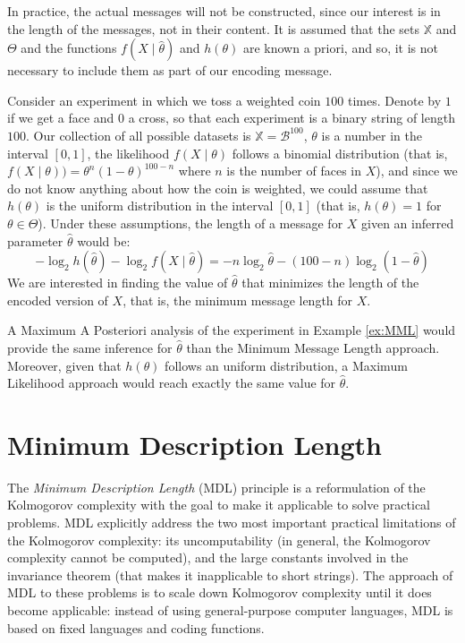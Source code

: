 {\begin{definition}
\end{definition}

In practice, the actual messages will not be constructed, since our interest is in the length of the messages, not in their content. It is assumed that the sets $\mathbb{X}$ and $\Theta$ and the functions $f(X \mid \hat\theta)$ and $h(\theta)$ are known a priori, and so, it is not necessary to include them as part of our encoding message.

\begin{example}
    \label{ex:MML}
    Consider an experiment in which we toss a weighted coin $100$ times. Denote by $1$ if we get a face and $0$ a cross, so that each experiment is a binary string of length $100$. Our collection of all possible datasets is $\mathbb{X} = \mathcal{B}^{100}$, $\theta$ is a number in the interval $[0, 1]$, the likelihood $f (X \mid \theta)$ follows a binomial distribution (that is, $f (X \mid \theta) ) = \theta^n (1-\theta)^{100-n}$ where $n$ is the number of faces in $X$), and since we do not know anything about how the coin is weighted, we could assume that $h(\theta)$ is the uniform distribution in the interval $[0, 1]$ (that is, $h(\theta) = 1$ for $\theta \in \Theta$). Under these assumptions, the length of a message for $X$ given an inferred parameter $\hat\theta$ would be:
    \[
        - \log_2 h \left( \hat\theta \right) - \log_2 f \left( X \mid \hat\theta \right) = - n \log_2 \hat\theta - (100-n) \log_2 (1 - \hat\theta)
    \]
    We are interested in finding the value of $\hat\theta$ that minimizes the length of the encoded version of $X$, that is, the minimum message length for $X$.
\end{example}

A Maximum A Posteriori analysis of the experiment in Example \ref{ex:MML} would provide the same inference for $\hat\theta$ than the Minimum Message Length approach. Moreover, given that $h(\theta)$ follows an uniform distribution, a Maximum Likelihood approach would reach exactly the same value for $\hat\theta$.

%
%
\section{Minimum Description Length}
\label{sec:MDL}

The \emph{Minimum Description Length} (MDL) principle is a reformulation
of the Kolmogorov complexity with the goal to make it applicable to
solve practical problems. MDL explicitly address the two most important
practical limitations of the Kolmogorov complexity: its uncomputability
(in general, the Kolmogorov complexity cannot be computed), and the
large constants involved in the invariance theorem (that makes it
inapplicable to short strings). The approach of MDL to these problems
is to scale down Kolmogorov complexity until it does become applicable:
instead of using general-purpose computer languages, MDL is based
on fixed languages and coding functions.

}

